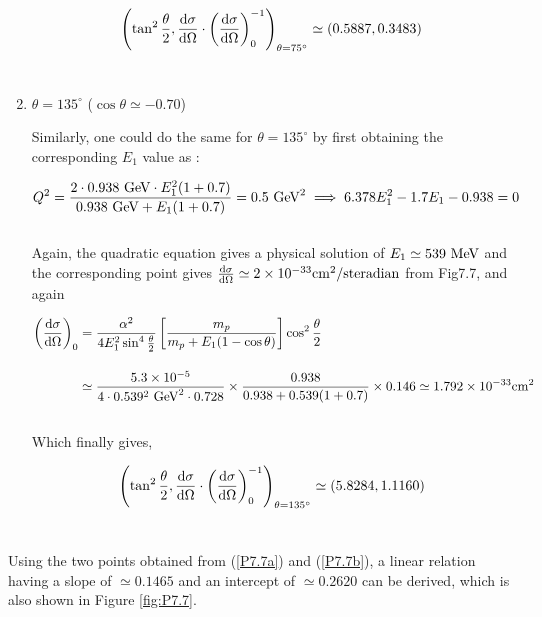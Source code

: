\begin{solution}
\begin{enumerate}[label=(\alph*)]
        \begin{align} \label{P7.7a}
            \left( \tan^2\frac{\theta}{2}, \frac{\mathop{}\!\mathrm{d}\sigma}{\mathop{}\!\mathrm{d}\Omega}\cdot\left(  \frac{\mathop{}\!\mathrm{d}\sigma}{\mathop{}\!\mathrm{d}\Omega} \right)_0^{-1} \right)_{\theta=75^\circ} \simeq \left( 0.5887 , 0.3483 \right)
        \end{align}\\

    \item $\theta=135^\circ$ ($\cos\theta \simeq -0.70$)
    
        Similarly, one could do the same for $\theta=135^\circ$ by first obtaining the corresponding $E_1$ value as :

        \begin{align*}
            Q^2 = \frac{2 \cdot 0.938 \text{ GeV} \cdot E_1^2 (1+0.7)}{0.938 \text{ GeV} +E_1(1+0.7)} = 0.5 \text{ GeV}^2 \implies 6.378E_1^2 - 1.7 E_1 -0.938 = 0  
        \end{align*}\\
        Again, the quadratic equation gives a physical solution of $E_1\simeq 539 \text{ MeV}$ and the corresponding point gives $\frac{\dif\sigma}{\dif\Omega} \simeq \num{2e-33}\unit{cm^2/steradian}$ from Fig7.7, and again 
        
        \begin{align*}
            \left( \frac{\dif\sigma}{\dif\Omega} \right)_0 &= \frac{\alpha^2}{4E_1^2\sin^4\frac{\theta}{2}}\left[ \frac{m_p}{m_p+E_1(1-\cos\theta)} \right] \cos^2\frac{\theta}{2} \\[0.15in]
            &\simeq \frac{\num{5.3e-5}}{4\cdot0.539^2 \GeV^2 \cdot 0.728} \times \frac{0.938  }{0.938  + 0.539 (1+0.7)} \times 0.146 \simeq \num{1.792e-33} \unit{cm}^2
        \end{align*}\\
        Which finally gives, 

        \begin{align}  \label{P7.7b}
            \left( \tan^2\frac{\theta}{2}, \frac{\mathop{}\!\mathrm{d}\sigma}{\mathop{}\!\mathrm{d}\Omega}\cdot\left(  \frac{\mathop{}\!\mathrm{d}\sigma}{\mathop{}\!\mathrm{d}\Omega} \right)_0^{-1} \right)_{\theta=135^\circ} \simeq \left( 5.8284 , 1.1160 \right)
        \end{align}\\
\end{enumerate}
Using the two points obtained from (\ref{P7.7a}) and (\ref{P7.7b}), a linear relation having a slope of $\simeq0.1465$ and an intercept of $\simeq0.2620$ can be derived, which is also shown in Figure \ref{fig:P7.7}. \\


\end{solution}
